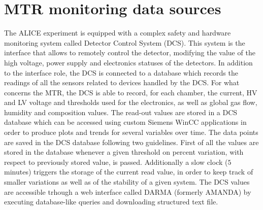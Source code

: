 \section{MTR monitoring data sources}
The ALICE experiment is equipped with a complex safety and hardware monitoring system called Detector Control System (DCS).
This system is the interface that allows to remotely control the detector, modifying the value of the high voltage, power supply and electronics statuses of the detectors.
In addition to the interface role, the DCS is connected to a database which records the readings of all the sensors related to devices handled by the DCS.
For what concerns the MTR, the DCS is able to record, for each chamber, the current, HV and LV voltage and thresholds used for the electronics, as well as global gas flow, humidity and composition values.
The read-out values are stored in a DCS database which can be accessed using custom Siemens WinCC applications in order to produce plots and trends for several variables over time.
The data points are saved in the DCS database following two guidelines.
First of all the values are stored in the database whenever a given threshold on percent variation, with respect to previously stored value, is passed.
Additionally a slow clock ($5$ minutes) triggers the storage of the current read value, in order to keep track of smaller variations as well as of the stability of a given system.
The DCS values are accessible trhough a web interface called DARMA (formerly AMANDA) by executing database-like queries and downloading structured text file.


